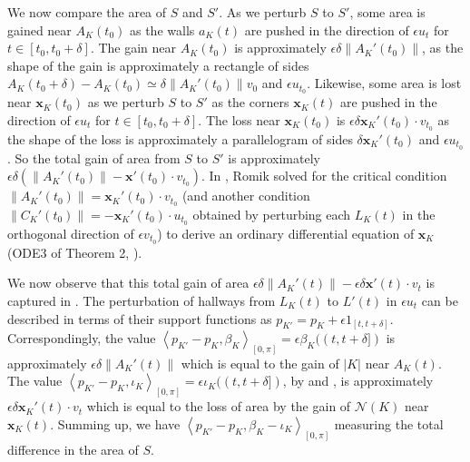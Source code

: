 We now compare the area of \(S\) and \(S'\). As we perturb \(S\) to \(S'\), some area is gained near \(A_K(t_0)\) as the walls \(a_K(t)\) are pushed in the direction of \(\epsilon u_t\) for \(t \in [t_0, t_0 + \delta]\). The gain near \(A_K(t_0)\) is approximately \(\epsilon \delta \left\lVert A_K'(t_0) \right\rVert\), as the shape of the gain is approximately a rectangle of sides \(A_K(t_0 + \delta) - A_K(t_0) \simeq \delta \left\lVert A_K'(t_0) \right\rVert v_0\) and \(\epsilon u_{t_0}\). Likewise, some area is lost near \(\mathbf{x}_K(t_0)\) as we perturb \(S\) to \(S'\) as the corners \(\mathbf{x}_K(t)\) are pushed in the direction of \(\epsilon u_t\) for \(t \in [t_0, t_0 + \delta]\). The loss near \(\mathbf{x}_K(t_0)\) is \(\epsilon \delta \mathbf{x}_K'(t_0) \cdot v_{t_0}\) as the shape of the loss is approximately a parallelogram of sides \(\delta \mathbf{x}_K'(t_0)\) and \(\epsilon u_{t_0}\). So the total gain of area from \(S\) to \(S'\) is approximately \(\epsilon \delta \left( \left\lVert A_K'(t_0) \right\rVert - \mathbf{x}'(t_0) \cdot v_{t_0} \right)\). In \autocite{romikDifferentialEquationsExact2018}, Romik solved for the critical condition \(\left\lVert A_K'(t_0) \right\rVert = \mathbf{x}_K'(t_0) \cdot v_{t_0}\) (and another condition \(\left\lVert C_K'(t_0) \right\rVert = - \mathbf{x}_K'(t_0) \cdot u_{t_0}\) obtained by perturbing each \(L_K(t)\) in the orthogonal direction of \(\epsilon v_{t_0}\)) to derive an ordinary differential equation of \(\mathbf{x}_K\) (ODE3 of Theorem 2, \autocite{romikDifferentialEquationsExact2018}).

We now observe that this total gain of area \(\epsilon \delta \left\lVert A_K'(t) \right\rVert - \epsilon \delta \mathbf{x}'(t) \cdot v_t\) is captured in . The perturbation of hallways from \(L_K(t)\) to \(L'(t)\) in \(\epsilon u_t\) can be described in terms of their support functions as \(p_{K'} = p_K + \epsilon 1_{[t, t + \delta]}\). Correspondingly, the value \(\left< p_{K'} - p_{K}, \beta_{K} \right>_{[0, \pi]} = \epsilon \beta_{K}((t, t + \delta])\) is approximately \(\epsilon \delta \left\lVert A_K'(t) \right\rVert\) which is equal to the gain of \(|K|\) near \(A_K(t)\). The value \(\left< p_{K'} - p_{K}, \iota_{K} \right>_{[0, \pi]} = \epsilon \iota_{K}((t, t + \delta])\), by  and , is approximately \(\epsilon \delta \mathbf{x}_{K}'(t) \cdot v_t\) which is equal to the loss of area by the gain of \(\mathcal{N}(K)\) near \(\mathbf{x}_K(t)\). Summing up, we have \(\left< p_{K'} - p_{K}, \beta_{K} - \iota_{K} \right>_{[0, \pi]}\) measuring the total difference in the area of \(S\).

